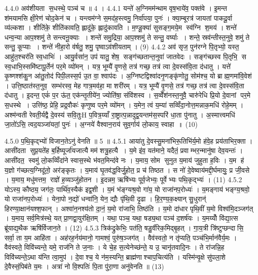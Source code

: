 4.4.0
अव॑शीयता स॒धस्थे॒ पञ्च॑ च ॥ 4 ।
4.4.1
यन्ते॑ अ॒ग्निमम॑न्थाम वृष॒भाये॑व॒ पक्त॑वे । इ॒मन्त श॑मयामसि क्षी॒रेण॑ चोद॒केन॑ च । यन्त्वम॑ग्ने स॒मद॑ह॒स्त्वमु॒ निर्वा॑पया॒ पुनः॑ । क्या॒म्बूरत्र॑ जायतां पाकदू॒र्वा व्य॑ल्कशा । शीति॑के॒ शीति॑कावति॒ ह्लादु॑के॒ ह्लादु॑कावति । म॒ण्डू॒क्या॑ सुसङ्ग॒मये॒म स्व॑ग्नि श॒मय॑ । शन्ते॑ धन्व॒न्या आप॒श्शमु॑ ते सन्त्वनू॒क्याः । शन्ते॑ समु॒द्रिया॒ आप॒श्शमु॑ ते सन्तु॒ वर्ष्याः । शन्ते॒ स्रव॑न्तीस्त॒नुवे॒ शमु॑ ते सन्तु॒ कूप्याः । शन्ते॑ नीहा॒रो व॑र्\mbox{}षतु॒ शमु॒ पृष्वाऽव॑शीयताम् । (9)
4.4.2
अव॑ सृज॒ पुन॑रग्ने पि॒तृभ्यो॒ यस्त॒ आहु॑त॒श्चर॑ति स्व॒धाभिः॑ । आयु॒र्वसा॑न॒ उप॑ यातु॒ शेष॒ सङ्ग॑च्छतान्त॒नुवा॑ जातवेदः । सङ्ग॑च्छस्व पि॒तृभि॒ स स्व॒धाभि॒स्समि॑ष्टापू॒र्तेन॑ पर॒मे व्यो॑मन् । यत्र॒ भूम्यै॑ वृ॒णसे॒ तत्र॑ गच्छ॒ तत्र॑ त्वा दे॒वस्स॑वि॒ता द॑धातु । यत्ते॑ कृ॒ष्णश्श॑कु॒न आ॑तु॒तोद॑ पिपी॒लस्स॒र्प उ॒त वा॒ श्वाप॑दः । अ॒ग्निष्टद्विश्वा॑दनृ॒णङ्कृ॑णोतु॒ सोम॑श्च॒ यो ब्राह्म॒णमा॑वि॒वेश॑ । उत्ति॒ष्ठात॑स्त॒नुव॒ सम्भ॑रस्व॒ मेह गात्र॒मव॑हा॒ मा शरी॑रम् । यत्र॒ भूम्यै॑ वृ॒णसे॒ तत्र॑ गच्छ॒ तत्र॑ त्वा दे॒वस्स॑वि॒ता द॑धातु । इ॒दन्त॒ एकं॑ प॒र ऊ॑त॒ एक॑न्तृ॒तीये॑न॒ ज्योति॑षा॒ संवि॑शस्व । स॒व्वेँश॑नस्त॒नुवै॒ चारु॑रेधि प्रि॒यो दे॒वानां पर॒मे स॒धस्थे । उत्ति॑ष्ठ॒ प्रेहि॒ प्रद्र॒वौकः॑ कृणुष्व पर॒मे व्यो॑मन् । य॒मेन॒ त्वं य॒म्या॑ सव्विँदा॒नोत्त॒मन्नाक॒मधि॑ रोहे॒मम् । अश्म॑न्वती रेवती॒र्यद्वै दे॒वस्य॑ सवि॒तुःH प॒वित्र॒य्याँ रा॒ष्ट्रात्प॒न्नादुद्व॒यन्तम॑स॒स्परि॑ धा॒ता पु॑नातु । अ॒स्मात्त्वमधि॑ जा॒तो॑ऽसि॒ त्वद॒यञ्जा॑यतां॒ पुनः॑ । अ॒ग्नये॑ वैश्वान॒राय॑ सुव॒र्गाय॑ लो॒काय॒ स्वाहा ॥ (10)
\anuvakamend

4.5.0
प॒थि॒कृद्भ्यो॑ विजान॒तेऽनु॑ वेनति ॥ 5 ॥
4.5.1
आया॑तु दे॒वस्सु॒मना॑भिरू॒तिभि॑र्य॒मो ह॑वे॒ह प्रय॑ताभिर॒क्ता । आसी॑दता सुप्र॒यते॑ह ब॒र्\mbox{}हिष्यूर्जा॑यजात्यै मम॑ शत्रु॒हत्यै । य॒मे इ॑व॒ यत॑माने॒ यदैतं॒ प्रवाम्भर॒न्मानु॑षा देव॒यन्तः॑ । आसी॑दत॒ स्वमु॑ लो॒कव्विँदा॑ने स्वास॒स्थे भ॑वत॒मिन्द॑वे नः । य॒माय॒ सोम सुनुत य॒माय॑ जुहुता ह॒विः । य॒म ह॑ य॒ज्ञो ग॑च्छत्य॒ग्निदू॑तो॒ अर॑ङ्कृतः । य॒माय॑ घृ॒तव॑द्ध॒विर्जु॒होत॒ प्र च॑ तिष्ठत । स नो॑ दे॒वेष्वाय॑मद्दी॒र्घमायुः॒ प्र जी॒वसे । य॒माय॒ मधु॑मत्तम॒ राज्ञे॑ ह॒व्यञ्जु॑होतन । इ॒दन्नम॒ ऋषि॑भ्यः पूर्व॒जेभ्यः॒ पूर्वेभ्यः पथि॒कृद्भ्यः॑ । (11)
4.5.2
योऽस्य॒ कौष्ठ्य॒ जग॑तः॒ पार्थि॑व॒स्यैक॑ इद्व॒शी । य॒मं भ॑ङ्ग्यश्र॒वो गा॑य॒ यो राजा॑नप॒रोध्यः॑ । य॒मङ्गाय॑ भङ्ग्य॒श्रवो॒ यो राजा॑नप॒रोध्यः॑ । येना॒पो न॒द्यो॑ धन्वा॑नि॒ येन॒ द्यौः पृ॑थि॒वी दृ॒ढा । हि॒र॒ण्य॒क॒क्ष्यान् सु॒धुरान्॑ हिरण्या॒क्षान॑यश्श॒फान् । अश्वा॑न॒नश्य॑तो दा॒नं॒ य॒मो रा॑जाभि॒ तिष्ठ॑ति । य॒मो दा॑धार पृथि॒वीं य॒मो विश्व॑मि॒दञ्जग॑त् । य॒माय॒ सर्व॒मित्र॑स्थे॒ यत् प्रा॒णद्वा॒युर॑क्षि॒तम् । यथा॒ पञ्च॒ यथा॒ षड्य॒था पञ्च॑ द॒शर्\mbox{}ष॑यः । य॒मय्योँ वि॑द्या॒त्स ब्रू॑याद्य॒थैक ऋषि॑र्विजान॒ते । (12)
4.5.3
त्रिक॑द्रुकेभिः॒ पत॑ति॒ षडु॒र्वीरेक॒मिद्बृ॒हत् । गा॒य॒त्री त्रि॑ष्टुप्छन्दासि॒ सर्वा॒ ता य॒म आहि॑ता । अह॑रह॒र्नय॑मानो॒ गामश्वं॒ पुरु॑ष॒ञ्जग॑त् । वैव॑स्वतो॒ न तृ॑प्यति॒ पञ्च॑भि॒र्मान॑वैर्य॒मः । वैव॑स्वते॒ विवि॑च्यन्ते॒ यमे॒ राज॑नि ते ज॒नाः । ये चे॒ह स॒त्येनेच्छ॑न्ते॒ य उ॒ चानृ॑तवादि॒नः । ते रा॑जन्नि॒ह विवि॑च्यन्ते॒ऽथा य॑न्ति त्वा॒मुप॑ । दे॒वाश्च॒ ये न॑म॒स्यन्ति॒ ब्राह्म॑णाश्चाप॒चित्य॑ति । यस्मि॑न्वृ॒क्षे सु॑पला॒शे दे॒वैस्सं॒पिब॑ते य॒मः । अत्रा॑ नो वि॒श्पतिः॑ पि॒ता पु॑रा॒णा अनु॑वेनति ॥ (13)
\anuvakamend

